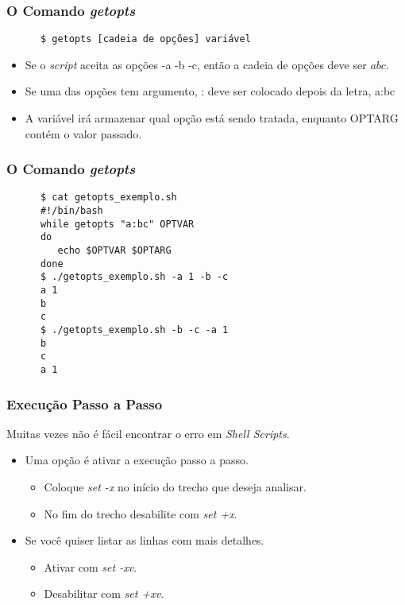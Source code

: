 \documentclass{beamer}
\begin{document}
   \begin{frame}[fragile]
      \frametitle{O Comando \textit{getopts}}
      \begin{verbatim}
      $ getopts [cadeia de opções] variável 
      \end{verbatim}
      \begin{itemize}
         \item Se o \textit{script} aceita as opções -a -b -c, então a cadeia de opções deve ser $abc$. 
         \item Se uma das opções tem argumento, : deve ser colocado depois da letra, a:bc 
         \item A variável irá armazenar qual opção está sendo tratada, enquanto OPTARG contém o valor passado.
      \end{itemize}	 
\end{frame}
   
   \begin{frame}[fragile]
      \frametitle{O Comando \textit{getopts}}
     \begin{verbatim}
      $ cat getopts_exemplo.sh 
      #!/bin/bash
      while getopts "a:bc" OPTVAR
      do
         echo $OPTVAR $OPTARG
      done
      $ ./getopts_exemplo.sh -a 1 -b -c
      a 1
      b
      c
      $ ./getopts_exemplo.sh -b -c -a 1  
      b
      c
      a 1
      \end{verbatim}
\end{frame}

   \begin{frame}
      \frametitle{Execução Passo a Passo}
      Muitas vezes não é fácil encontrar o erro em \textit{Shell Scripts}.
      \begin{itemize}
         \item Uma opção é ativar a execução passo a passo.
	 \begin{itemize}
	    \item Coloque \textit{set -x} no início do trecho que deseja analisar.
	    \item No fim do trecho desabilite com \textit{set +x}. 
	 \end{itemize}
	 \item Se você quiser listar as linhas com mais detalhes.
	 \begin{itemize}
	    \item Ativar com \textit{set -xv}.
	    \item Desabilitar com \textit{set +xv}.
	 \end{itemize}
      \end{itemize}
   \end{frame}
\end{document}
